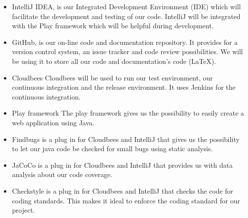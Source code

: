 \begin{itemize}
\item IntelliJ IDEA, is our Integrated Development Environment (IDE) which will facilitate the development and testing of our code.
IntelliJ will be integrated with the Play framework which will be helpful during development.
\item GitHub, is our on-line code and documentation repository.
It provides for a version control system, an issue tracker and code review possibilities.
We will be using it to store all our code and documentation's code (LaTeX).
\item Cloudbees
Cloudbees will be used to run our test environment, our continuous integration and the release environment.
It uses Jenkins for the continuous integration.
\item Play framework
The play framework gives us the possibility to easily create a web application using Java.
\item Findbugs is a plug in for Cloudbees and IntelliJ that gives us the possibility to let our java code be checked for small bugs using static analysis.
\item JaCoCo is a plug in for Cloudbees and IntelliJ that provides us with data analysis about our code coverage.
\item Checkstyle is a plug in for Cloudbees and IntelliJ that checks the code for coding standards.
This makes it ideal to enforce the coding standard for our project.
\end{itemize}
